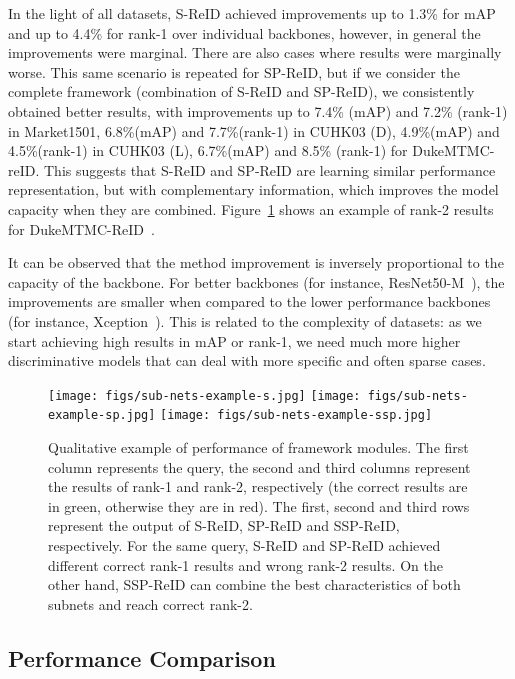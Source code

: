 \documentclass[final,3p,times,twocolumn]{elsarticle}
\begin{document}
In the light of all datasets, S-ReID achieved improvements up to 1.3\% for mAP and up to 4.4\% for rank-1 over individual backbones, however, in general the improvements were marginal. There are also cases where results were marginally worse. This same scenario is repeated for SP-ReID, but if we consider the complete framework (combination of S-ReID and SP-ReID), we consistently obtained better results, with improvements up to 7.4\% (mAP) and 7.2\% (rank-1) in Market1501, 6.8\%(mAP) and 7.7\%(rank-1) in CUHK03 (D), 4.9\%(mAP) and 4.5\%(rank-1) in CUHK03 (L), 6.7\%(mAP) and 8.5\% (rank-1) for DukeMTMC-reID. This suggests that S-ReID and SP-ReID are learning similar performance representation, but with complementary information, which improves the model capacity when they are combined. Figure~\ref{fig:sub-net-example} shows an example of rank-2 results for DukeMTMC-ReID~\cite{zheng2017unlabeled}.

It can be observed that the method improvement is inversely proportional to the capacity of the backbone. For better backbones (for instance, ResNet50-M~\cite{yu2017devil}), the improvements are smaller when compared to the lower performance backbones (for instance, Xception~\cite{chollet2016xception}). This is related to the complexity of datasets: as we start achieving high results in mAP or rank-1, we need much more higher discriminative models that can deal with more specific and often sparse cases.

\begin{figure}[!htb]
\setlength{\figw}{5.0cm}
\centering
\texttt{[image: figs/sub-nets-example-s.jpg]} \hspace*{0.01cm}
\texttt{[image: figs/sub-nets-example-sp.jpg]} \hspace*{0.01cm}
\texttt{[image: figs/sub-nets-example-ssp.jpg]}
\caption{Qualitative example of performance of framework modules. The first column represents the query, the second and third columns represent the results of rank-1 and rank-2, respectively (the correct results are in green, otherwise they are in red). The first, second and third rows represent the output of S-ReID, SP-ReID and SSP-ReID, respectively. For the same query, S-ReID and SP-ReID achieved different correct rank-1 results and wrong rank-2 results. On the other hand, SSP-ReID can combine the best characteristics of both subnets and reach correct rank-2.}
\label{fig:sub-net-example}
\end{figure}

\subsection{Performance Comparison}
\end{document}
